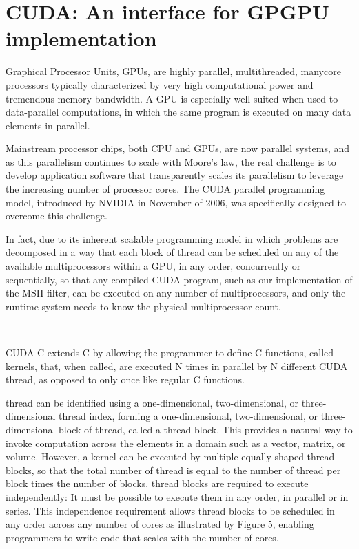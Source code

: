 \section{CUDA: An interface for GPGPU implementation}
Graphical Processor Units, GPUs, are highly parallel, multithreaded, manycore
processors typically characterized by very high computational power and
tremendous memory bandwidth. A GPU is especially well-suited when used to
data-parallel computations, in which the same program is executed on many data
elements in parallel.~\cite[p.~1.1]{CUDA18}

Mainstream processor chips, both CPU and GPUs, are now parallel systems, and as
this parallelism continues to scale with Moore's law, the real challenge is to
develop application software that transparently scales its parallelism to
leverage the increasing number of processor cores. The CUDA parallel
programming model, introduced by NVIDIA in November of 2006, was specifically
designed to overcome this challenge.~\cite[p.~1.3]{CUDA18}

In fact, due to its inherent scalable programming model in which problems are
decomposed in a way that each block of thread can be scheduled on
any of the available multiprocessors within a GPU, in any order, concurrently
or sequentially, so that any compiled CUDA program, such as our implementation
of the MSII filter, can be executed on any number of multiprocessors, and only
the runtime system needs to know the physical multiprocessor
count.~\cite[p.~1.3]{CUDA18}

~~~~~~~~~

CUDA C extends C by allowing the programmer to define C functions, called
kernels, that, when called, are executed N times in parallel by N different
CUDA thread, as opposed to only once like regular C
functions.~\cite[p.~2.1]{CUDA18}

thread can be identified using a one-dimensional,
two-dimensional, or three-dimensional thread index, forming a
one-dimensional, two-dimensional, or three-dimensional block of
thread, called a thread block. This provides a
natural way to invoke computation across the elements in a domain such as a
vector, matrix, or volume. However, a kernel can be executed by multiple
equally-shaped thread blocks, so that the total number of
thread is equal to the number of thread per block
times the number of blocks. thread blocks are required to execute
independently: It must be possible to execute them in any order, in parallel or
in series. This independence requirement allows thread blocks to
be scheduled in any order across any number of cores as illustrated by Figure 5,
enabling programmers to write code that scales with the number of
cores.~\cite[p.~2.2]{CUDA18}

